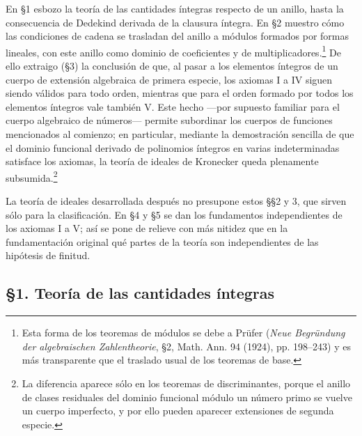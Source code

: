 \documentclass[11pt]{article}
\begin{document}
En §1 esbozo la teoría de las cantidades íntegras respecto de un anillo, hasta la consecuencia de Dedekind derivada de la clausura íntegra. En §2 muestro cómo las condiciones de cadena se trasladan del anillo a módulos formados por formas lineales, con este anillo como dominio de coeficientes y de multiplicadores.\footnote{Esta forma de los teoremas de módulos se debe a Prüfer (\emph{Neue Begründung der algebraischen Zahlentheorie}, §2, Math. Ann. 94 (1924), pp. 198--243) y es más transparente que el traslado usual de los teoremas de base.} De ello extraigo (§3) la conclusión de que, al pasar a los elementos íntegros de un cuerpo de extensión algebraica de primera especie, los axiomas I a IV siguen siendo válidos para todo orden, mientras que para el orden formado por todos los elementos íntegros vale también V. Este hecho ---por supuesto familiar para el cuerpo algebraico de números--- permite subordinar los cuerpos de funciones mencionados al comienzo; en particular, mediante la demostración sencilla de que el dominio funcional derivado de polinomios íntegros en varias indeterminadas satisface los axiomas, la teoría de ideales de Kronecker queda plenamente subsumida.\footnote{La diferencia aparece sólo en los teoremas de discriminantes, porque el anillo de clases residuales del dominio funcional módulo un número primo se vuelve un cuerpo imperfecto, y por ello pueden aparecer extensiones de segunda especie.}

La teoría de ideales desarrollada después no presupone estos §§2 y 3, que sirven sólo para la clasificación. En §4 y §5 se dan los fundamentos independientes de los axiomas I a V; así se pone de relieve con más nitidez que en la fundamentación original qué partes de la teoría son independientes de las hipótesis de finitud.

\subsection*{§1. Teoría de las cantidades íntegras}
\end{document}
